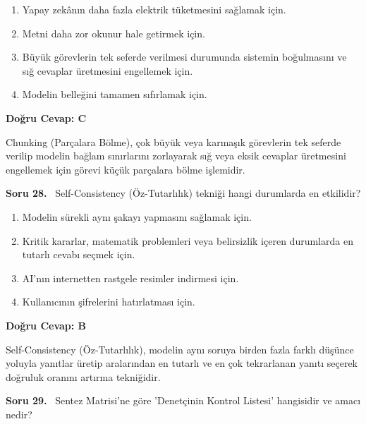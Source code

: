 \documentclass[11pt,a4paper,openany]{book}
\begin{document}
\begin{enumerate}[label=\Alph*), leftmargin=25pt, topsep=4pt, itemsep=2pt]
        \item Yapay zekânın daha fazla elektrik tüketmesini sağlamak için.
        \item Metni daha zor okunur hale getirmek için.
        \item Büyük görevlerin tek seferde verilmesi durumunda sistemin boğulmasını ve sığ cevaplar üretmesini engellemek için.
        \item Modelin belleğini tamamen sıfırlamak için.
\end{enumerate}

\vspace{4pt}
\begin{tcolorbox}[title=Cevap ve Açıklama, colback=gray!3!white, colframe=primarycolor!90!black, arc=2mm, fonttitle=\bfseries\sffamily, top=6pt, bottom=6pt]
    \textbf{Doğru Cevap: C}

    \vspace{2pt}
    Chunking (Parçalara Bölme), çok büyük veya karmaşık görevlerin tek seferde verilip modelin bağlam sınırlarını zorlayarak sığ veya eksik cevaplar üretmesini engellemek için görevi küçük parçalara bölme işlemidir.
\end{tcolorbox}
\vspace{10pt}
\needspace{5cm}
\vspace{8pt}
\noindent\textbf{\large\sffamily Soru 28.} \ Self-Consistency (Öz-Tutarlılık) tekniği hangi durumlarda en etkilidir?

\begin{enumerate}[label=\Alph*), leftmargin=25pt, topsep=4pt, itemsep=2pt]
        \item Modelin sürekli aynı şakayı yapmasını sağlamak için.
        \item Kritik kararlar, matematik problemleri veya belirsizlik içeren durumlarda en tutarlı cevabı seçmek için.
        \item AI'nın internetten rastgele resimler indirmesi için.
        \item Kullanıcının şifrelerini hatırlatması için.
\end{enumerate}

\vspace{4pt}
\begin{tcolorbox}[title=Cevap ve Açıklama, colback=gray!3!white, colframe=primarycolor!90!black, arc=2mm, fonttitle=\bfseries\sffamily, top=6pt, bottom=6pt]
    \textbf{Doğru Cevap: B}

    \vspace{2pt}
    Self-Consistency (Öz-Tutarlılık), modelin aynı soruya birden fazla farklı düşünce yoluyla yanıtlar üretip aralarından en tutarlı ve en çok tekrarlanan yanıtı seçerek doğruluk oranını artırma tekniğidir.
\end{tcolorbox}
\vspace{10pt}
\needspace{5cm}
\vspace{8pt}
\noindent\textbf{\large\sffamily Soru 29.} \ Sentez Matrisi'ne göre 'Denetçinin Kontrol Listesi' hangisidir ve amacı nedir?
\end{document}
